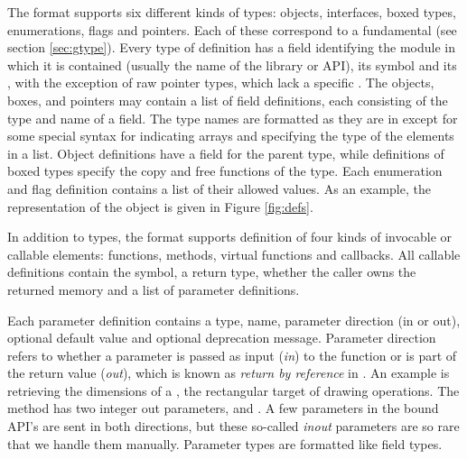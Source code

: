 \documentclass[article,shortnames]{jss}
\begin{document}
The  format supports six different kinds of types:
objects,
interfaces, boxed types, enumerations, flags and pointers. Each of
these correspond to a fundamental  (see section
\ref{sec:gtype}). 
Every type of definition has
a field identifying the module in which it is contained (usually the
name of the library or API), its  symbol and its
,
with the exception of raw pointer types, which lack a specific
. The objects, boxes, and pointers may contain a list of
field
definitions, each consisting of the type and name of a field. The type
names are formatted as they are in  except for some
special syntax for indicating arrays and specifying the type of the
elements in a list. Object definitions have a field for the parent
type, while definitions of boxed types specify the copy and free
functions of the type.  Each enumeration and flag definition contains
a list of their allowed values.  As an example, the 
representation of the  object is given in Figure
\ref{fig:defs}. 

In addition to types, the  format supports definition
of
four kinds of invocable or callable elements: functions, methods,
virtual functions and
callbacks. All callable definitions contain the  symbol, a
return type, whether the caller owns the returned memory and a list of
parameter definitions.

Each parameter definition contains a type,
name, parameter
direction (in or out),
optional default value and optional deprecation
message. Parameter direction refers to whether a parameter is passed
as input (\emph{in}) to the function or is part of the return value
(\emph{out}), which is known as \emph{return by reference} in
. An example is retrieving the dimensions of a
, the rectangular target of  drawing
operations. The method  has two integer out
parameters,  and . A few parameters in the
bound API's are sent in both directions, but these so-called
\emph{inout} parameters are so rare that we handle them manually.
Parameter types are formatted like field types. 
\end{document}
